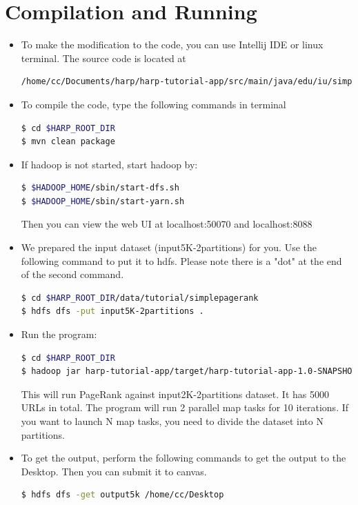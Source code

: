 \documentclass{article}
\begin{document}
\section*{Compilation and Running}
\begin{itemize}
\item To make the modification to the code, you can use Intellij IDE or linux terminal. The source code is located at 
\begin{lstlisting}[language=bash]
/home/cc/Documents/harp/harp-tutorial-app/src/main/java/edu/iu/simplepagerank
\end{lstlisting}
\item To compile the code, type the following commands in terminal
\begin{lstlisting}[language=bash]
$ cd $HARP_ROOT_DIR
$ mvn clean package
\end{lstlisting}

\item If hadoop is not started, start hadoop by:
\begin{lstlisting}[language=bash]
$ $HADOOP_HOME/sbin/start-dfs.sh
$ $HADOOP_HOME/sbin/start-yarn.sh
\end{lstlisting}
Then you can view the web UI at  localhost:50070 and localhost:8088


\item We prepared the input dataset (input5K-2partitions) for you. Use the following command to put it to hdfs. Please note there is a "dot" at the end of the second command.
\begin{lstlisting}[language=bash]
$ cd $HARP_ROOT_DIR/data/tutorial/simplepagerank
$ hdfs dfs -put input5K-2partitions .
\end{lstlisting}
\item Run the program:
\begin{lstlisting}[language=bash]
$ cd $HARP_ROOT_DIR
$ hadoop jar harp-tutorial-app/target/harp-tutorial-app-1.0-SNAPSHOT.jar edu.iu.simplepagerank.HarpPageRank input5K-2partitions output5k 5000 10
\end{lstlisting}
This will run PageRank against input2K-2partitions dataset. It has 5000 URLs in total. The program will run 2 parallel map tasks for 10 iterations.  If you want to launch N map tasks, you need to divide the dataset into N partitions.

\item To get the output, perform the following commands to get the output to the Desktop. Then you can submit it to canvas.
\begin{lstlisting}[language=bash]
$ hdfs dfs -get output5k /home/cc/Desktop
\end{lstlisting}
\end{itemize}
 
 
\end{document}
